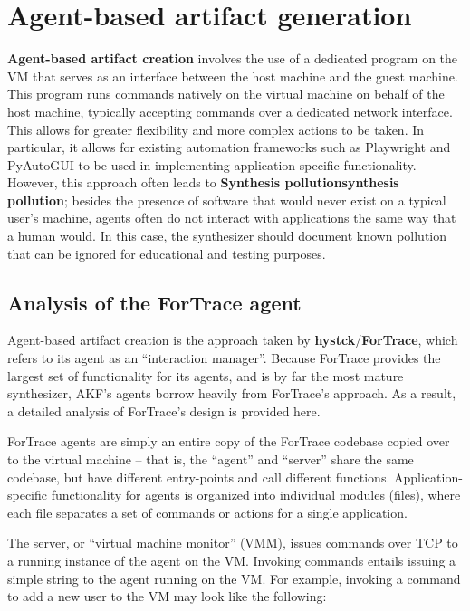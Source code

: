 \section{Agent-based artifact
generation}\label{agent-based-artifact-generation}

\textbf{Agent-based artifact creation} involves the use of a dedicated
program on the VM that serves as an interface between the host machine
and the guest machine. This program runs commands natively on the
virtual machine on behalf of the host machine, typically accepting
commands over a dedicated network interface. This allows for greater
flexibility and more complex actions to be taken. In particular, it
allows for existing automation frameworks such as Playwright and
PyAutoGUI to be used in implementing application-specific functionality.
However, this approach often leads to \textbf{Synthesis
pollution\textbar synthesis pollution}; besides the presence of software
that would never exist on a typical user's machine, agents often do not
interact with applications the same way that a human would. In this
case, the synthesizer should document known pollution that can be
ignored for educational and testing purposes.

\subsection{Analysis of the ForTrace
agent}\label{analysis-of-the-fortrace-agent}

Agent-based artifact creation is the approach taken by
\textbf{hystck}/\textbf{ForTrace}, which refers to its agent as an
``interaction manager''. Because ForTrace provides the largest set of
functionality for its agents, and is by far the most mature synthesizer,
AKF's agents borrow heavily from ForTrace's approach. As a result, a
detailed analysis of ForTrace's design is provided here.

ForTrace agents are simply an entire copy of the ForTrace codebase
copied over to the virtual machine -- that is, the ``agent'' and
``server'' share the same codebase, but have different entry-points and
call different functions. Application-specific functionality for agents
is organized into individual modules (files), where each file separates
a set of commands or actions for a single application.

The server, or ``virtual machine monitor'' (VMM), issues commands over
TCP to a running instance of the agent on the VM. Invoking commands
entails issuing a simple string to the agent running on the VM. For
example, invoking a command to add a new user to the VM may look like
the following:

